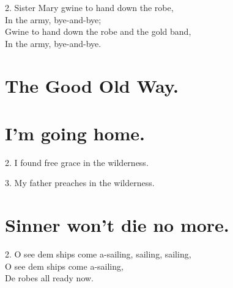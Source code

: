 \documentclass[a5paper,10pt]{book}
\begin{document}
\begin{song}
\end{song}

\begin{stanza}
\item[2.]
  Sister Mary gwine to hand down the robe,\\
  In the army, bye-and-bye;\\
  Gwine to hand down the robe and the gold band,\\
  In the army, bye-and-bye.
\end{stanza}


\newpage
\section{The Good Old Way.}
\thispagestyle{empty}

\begin{song}

\end{song}
	
\newpage
\section{I'm going home.}
\thispagestyle{empty}

\begin{song}
\end{song}

\begin{stanza}
\item[2.]
  I found free grace in the wilderness.
\item[3.]
  My father preaches in the wilderness.
\end{stanza}


\newpage
\section{Sinner won't die no more.}
\thispagestyle{empty}

\begin{song}
\end{song}

\begin{stanza}
\item[2.]
  O see dem ships come a-sailing, sailing, sailing,\\
  O see dem ships come a-sailing,\\
  De robes all ready now.
\end{stanza}
\end{document}

